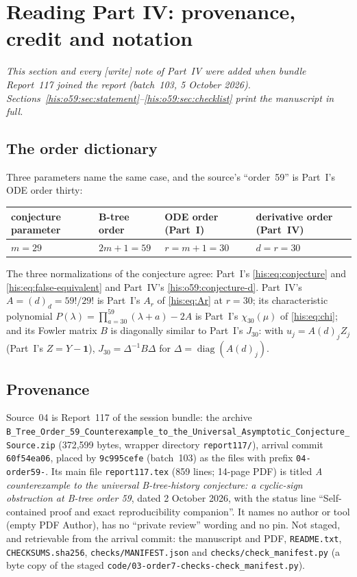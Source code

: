 \documentclass[11pt]{article}
\theoremstyle{remark}\newtheorem{remark}[theorem]{Remark}
\numberwithin{equation}{section}
\begin{document}
\section{Reading Part IV: provenance, credit and notation}\label{his:o59:sec:reading}
\emph{This section and every \textsf{[write]} note of Part~IV were added when bundle Report~117 joined the report (batch~103, 5 October 2026). Sections~\ref{his:o59:sec:statement}--\ref{his:o59:sec:checklist} print the manuscript in full.}

\subsection{The order dictionary}\label{his:o59:sec:dictionary}
Three parameters name the same case, and the source's ``order~59'' is Part~I's ODE order thirty:
\begin{center}\small
\begin{tabular}{@{}llll@{}}
\toprule
conjecture parameter & B-tree order & ODE order (Part~I) & derivative order (Part~IV)\\
\midrule
$m=29$ & $2m+1=59$ & $r=m+1=30$ & $d=r=30$\\
\bottomrule
\end{tabular}
\end{center}
The three normalizations of the conjecture agree: Part~I's \eqref{his:eq:conjecture} and \eqref{his:eq:false-equivalent} and Part~IV's \eqref{his:o59:conjecture-d}. Part~IV's $A=(d)_d=59!/29!$ is Part~I's $A_r$ of \eqref{his:eq:Ar} at $r=30$; its characteristic polynomial $P(\lambda)=\prod_{a=30}^{59}(\lambda+a)-2A$ is Part~I's $\chi_{30}(\mu)$ of \eqref{his:eq:chi}; and its Fowler matrix $B$ is diagonally similar to Part~I's $J_{30}$: with $u_j=A(d)_jZ_j$ (Part~I's $Z=Y-\mathbf 1$), $J_{30}=\Delta^{-1}B\Delta$ for $\Delta=\operatorname{diag}(A(d)_j)$.

\subsection{Provenance}\label{his:o59:sec:provenance}
{\sloppy{}\relax Source~04 is Report~117 of the session bundle: the archive \texttt{B\_Tree\_Order\_59\_\allowbreak Counterexample\_\allowbreak to\_the\_\allowbreak Universal\_\allowbreak Asymptotic\_\allowbreak Conjecture\_\allowbreak Source.zip} (372{,}599 bytes, wrapper directory \texttt{report117/}), arrival commit \texttt{60f54ea06}, placed by \texttt{9c995cefe} (batch~103) as the files with prefix \texttt{04-order59-}. Its main file \texttt{report117.tex} (859 lines; 14-page PDF) is titled \emph{A counterexample to the universal B-tree-history conjecture: a cyclic-sign obstruction at B-tree order 59}, dated 2 October 2026, with the status line ``Self-contained proof and exact reproducibility companion''. It names no author or tool (empty PDF Author), has no ``private review'' wording and no pin. Not staged, and retrievable from the arrival commit: the manuscript and PDF, \texttt{README.txt}, \texttt{CHECKSUMS.sha256}, \texttt{checks/MANIFEST.json} and \texttt{checks/check\_manifest.py} (a byte copy of the staged \texttt{code/03-order7-checks-check\_manifest.py}).\par}
\end{document}
